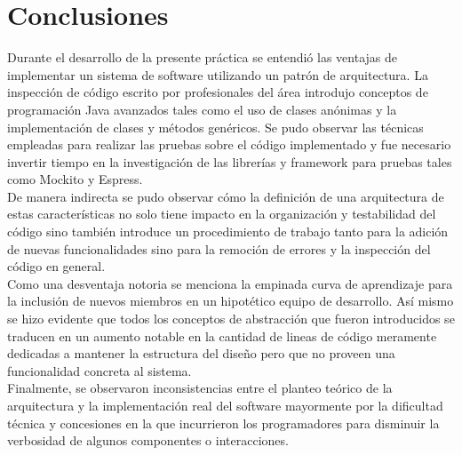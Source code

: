 
\chapter{Conclusiones} %

\label{Chapter6} %


Durante el desarrollo de la presente práctica se entendió las ventajas de implementar un sistema de software utilizando un patrón de arquitectura. La inspección de código escrito por profesionales del área introdujo conceptos de programación Java avanzados tales como el uso de clases anónimas y la implementación de clases y métodos genéricos. Se pudo observar las técnicas empleadas para realizar las pruebas sobre el código implementado y fue necesario invertir tiempo en la investigación de las librerías y framework para pruebas tales como Mockito y Espress.\\
De manera indirecta se pudo observar cómo la definición de una arquitectura de estas características no solo tiene impacto en la organización y testabilidad del código sino también introduce un procedimiento de trabajo tanto para la adición de nuevas funcionalidades sino para la remoción de errores y la inspección del código en general.\\
Como una desventaja notoria se menciona la empinada curva de aprendizaje para la inclusión de nuevos miembros en un hipotético equipo de desarrollo. Así mismo se hizo evidente que todos los conceptos de abstracción que fueron introducidos se traducen en un aumento notable en la cantidad de lineas de código meramente dedicadas a mantener la estructura del diseño pero que no proveen una funcionalidad concreta al sistema.\\
Finalmente, se observaron inconsistencias entre el planteo teórico de la arquitectura y la implementación real del software mayormente por la dificultad técnica y concesiones en la que incurrieron los programadores para disminuir la verbosidad de algunos componentes o interacciones.
